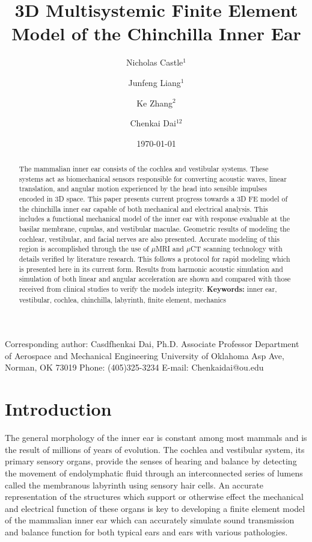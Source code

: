 \documentclass[12pt]{article}
\title{\textbf{3D Multisystemic Finite Element Model of the Chinchilla Inner Ear}}
\author{Nicholas Castle$^1$ \and Junfeng Liang$^1$\and Ke Zhang$^2$\and Chenkai Dai$^{12}$}
\institute{$^1$School of Aerospace and Mechanical Engineering \\ $^2$Stephenson School of Biomedical Engineering \\ University of Oklahoma, Norman OK 73019}
\date{\today}
\begin{document}
\maketitle

\noindent Corresponding author: \newline
Casdfhenkai Dai, Ph.D. \newline
Associate Professor \newline
Department of Aerospace and Mechanical Engineering \newline
University of Oklahoma  Asp Ave, \newline
Norman, OK 73019 \newline
Phone: (405)325-3234 \newline
E-mail: Chenkaidai@ou.edu \newline


\begin{abstract}
The mammalian inner ear consists of the cochlea and vestibular systems. These systems act as biomechanical sensors responsible for converting acoustic waves, linear translation, and angular motion experienced by the head into sensible impulses encoded in 3D space. This paper presents current progress towards a 3D FE model of the chinchilla inner ear capable of both mechanical and electrical analysis. This includes a functional mechanical model of the inner ear with response evaluable at the basilar membrane, cupulas, and vestibular maculae. Geometric results of modeling the cochlear, vestibular, and facial nerves are also presented. Accurate modeling of this region is accomplished through the use of $\mu$MRI and $\mu$CT scanning technology with details verified by literature research. This follows a protocol for rapid modeling which is presented here in its current form. Results from harmonic acoustic simulation and simulation of both linear and angular acceleration are shown and compared with those received from clinical studies to verify the models integrity. \newline \newline \textbf{Keywords:} inner ear, vestibular, cochlea, chinchilla, labyrinth, finite element, mechanics
\end{abstract}


\section{Introduction}
The general morphology of the inner ear is constant among most mammals and is the result of millions of years of evolution. \cite{ekdale:chinchanat} The cochlea and vestibular system, its primary sensory organs, provide the senses of hearing and balance by detecting the movement of endolymphatic fluid through an interconnected series of lumens called the membranous labyrinth using sensory hair cells. An accurate representation of the structures which support or otherwise effect the mechanical and electrical function of these organs is key to developing a finite element model of the mammalian inner ear which can accurately simulate sound transmission and balance function for both typical ears and ears with various pathologies. 
\end{document}
